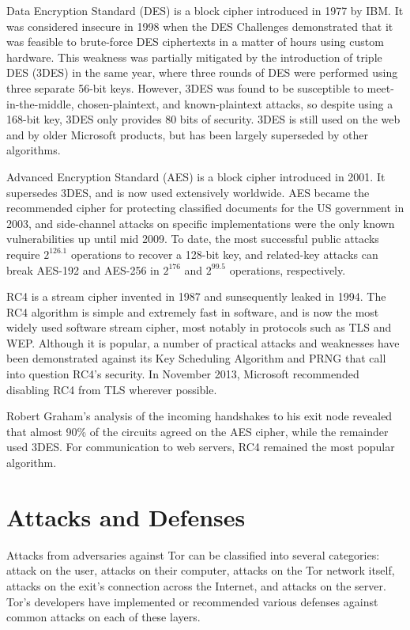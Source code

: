 \documentclass[journal]{IEEEtran}
\begin{document}
Data Encryption Standard (DES) is a block cipher introduced in 1977 by IBM. It was considered insecure in 1998 when the DES Challenges demonstrated that it was feasible to brute-force DES ciphertexts in a matter of hours using custom hardware. This weakness was partially mitigated by the introduction of triple DES (3DES) in the same year, where three rounds of DES were performed using three separate 56-bit keys. However, 3DES was found to be susceptible to meet-in-the-middle, chosen-plaintext, and known-plaintext attacks, so despite using a 168-bit key, 3DES only provides 80 bits of security.\cite{NIST2007} 3DES is still used on the web and by older Microsoft products, but has been largely superseded by other algorithms.

Advanced Encryption Standard (AES) is a block cipher introduced in 2001. It supersedes 3DES, and is now used extensively worldwide. AES became the recommended cipher for protecting classified documents for the US government in 2003, and side-channel attacks on specific implementations were the only known vulnerabilities up until mid 2009. To date, the most successful public attacks require $ 2^126.1 $ operations to recover a 128-bit key,\cite{Nikolic2009} and related-key attacks can break AES-192 and AES-256 in $ 2^176 $ and $ 2^99.5 $ operations,\cite{Bogdanov2011} respectively.

RC4 is a stream cipher invented in 1987 and sunsequently leaked in 1994. The RC4 algorithm is simple and extremely fast in software, and is now the most widely used software stream cipher, most notably in protocols such as TLS and WEP. Although it is popular, a number of practical attacks and weaknesses have been demonstrated against its Key Scheduling Algorithm and PRNG that call into question RC4's security. In November 2013, Microsoft recommended disabling RC4 from TLS wherever possible.

Robert Graham's analysis of the incoming handshakes to his exit node revealed that almost 90\% of the circuits agreed on the AES cipher, while the remainder used 3DES. For communication to web servers, RC4 remained the most popular algorithm.

\section{Attacks and Defenses}

Attacks from adversaries against Tor can be classified into several categories: attack on the user, attacks on their computer, attacks on the Tor network itself, attacks on the exit's connection across the Internet, and attacks on the server. Tor's developers have implemented or recommended various defenses against common attacks on each of these layers.
\end{document}
